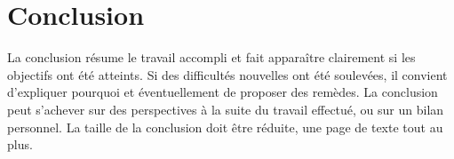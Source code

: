 \chapter*{Conclusion}

La conclusion résume le travail accompli et fait apparaître clairement si les objectifs ont été atteints. Si des difficultés nouvelles ont été soulevées, il convient d’expliquer pourquoi et éventuellement de proposer des remèdes. La conclusion peut s’achever sur des perspectives à la suite du travail effectué, ou sur un bilan personnel. La taille de la conclusion doit être réduite, une page de texte tout au plus.
